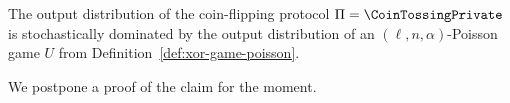 			




\begin{claim}\label{claim:correspondence-poissongame}
	The output distribution of the coin-flipping protocol $\Pi = \CoinTossingPrivate$ 
	is 
	stochastically dominated by the 
	output distribution of 
	an $(\ell, n, \alpha)$-Poisson game $U$ 
	from Definition~\ref{def:xor-game-poisson}.
\end{claim}
We postpone a proof of the claim for the moment.

